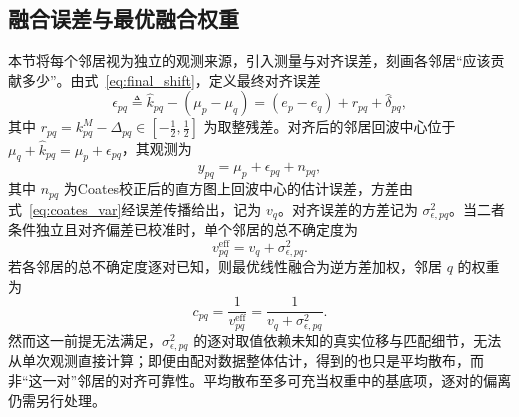 \subsection{融合误差与最优融合权重}
\label{sec:error_model}

本节将每个邻居视为独立的观测来源，引入测量与对齐误差，刻画各邻居``应该贡献多少''。由式~\eqref{eq:final_shift}，定义最终对齐误差
\begin{equation}
  \epsilon_{pq}\triangleq\hat k_{pq}-(\mu_p-\mu_q)
  =(e_p-e_q)+r_{pq}+\hat\delta_{pq},
  \label{eq:epsilon}
\end{equation}
其中 $r_{pq}=k_{pq}^{M}-\Delta_{pq}\in[-\tfrac12,\tfrac12]$ 为取整残差。对齐后的邻居回波中心位于 $\mu_q+\hat k_{pq}=\mu_p+\epsilon_{pq}$，其观测为
\begin{equation}
  y_{pq}=\mu_p+\epsilon_{pq}+n_{pq},
  \label{eq:neighbor_obs}
\end{equation}
其中 $n_{pq}$ 为Coates校正后的直方图上回波中心的估计误差，方差由式~\eqref{eq:coates_var}经误差传播给出，记为 $v_q$。对齐误差的方差记为 $\sigma_{\epsilon,pq}^2$。当二者条件独立且对齐偏差已校准时，单个邻居的总不确定度为
\begin{equation}
  v_{pq}^{\mathrm{eff}}=v_q+\sigma_{\epsilon,pq}^{2}.
  \label{eq:veff}
\end{equation}
若各邻居的总不确定度逐对已知，则最优线性融合为逆方差加权，邻居 $q$ 的权重为
\begin{equation}
  c_{pq}=\frac{1}{v_{pq}^{\mathrm{eff}}}
  =\frac{1}{v_q+\sigma_{\epsilon,pq}^{2}}.
  \label{eq:c_pq}
\end{equation}
然而这一前提无法满足，$\sigma_{\epsilon,pq}^{2}$ 的逐对取值依赖未知的真实位移与匹配细节，无法从单次观测直接计算；即便由配对数据整体估计，得到的也只是平均散布，而非``这一对''邻居的对齐可靠性。平均散布至多可充当权重中的基底项，逐对的偏离仍需另行处理。
